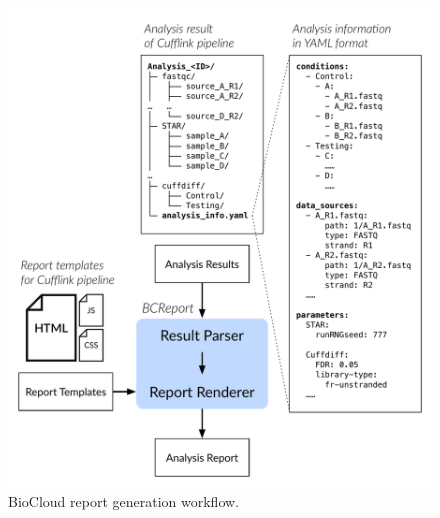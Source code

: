 \begin{figure}[!p]
\centering
\includegraphics[width=1\textwidth]{images/bcreport_workflow}
\caption[BioCloud report generation workflow]{
    BioCloud report generation workflow.
}
\label{fig:bcreport-workflow}
\end{figure}

